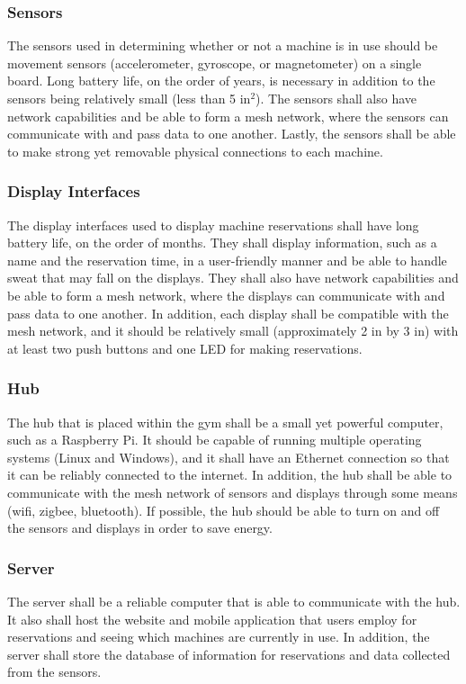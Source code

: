 \documentclass[PPFS.tex]{template/subfiles}
\begin{document}
\subsubsection{Sensors}
The sensors used in determining whether or not a machine is in use should be movement sensors (accelerometer, gyroscope, or magnetometer) on a single board. Long battery life, on the order of years, is necessary in addition to the sensors being relatively small (less than 5 in$^2$). The sensors shall also have network capabilities and be able to form a mesh network, where the sensors can communicate with and pass data to one another. Lastly, the sensors shall be able to make strong yet removable physical connections to each machine.

\subsubsection{Display Interfaces}
The display interfaces used to display machine reservations shall have long battery life, on the order of months. They shall display information, such as a name and the reservation time, in a user-friendly manner and be able to handle sweat that may fall on the displays. They shall also have network capabilities and be able to form a mesh network, where the displays can communicate with and pass data to one another. In addition, each display shall be compatible with the mesh network, and it should be relatively small (approximately 2 in by 3 in) with at least two push buttons and one LED for making reservations.

\subsubsection{Hub}
The hub that is placed within the gym shall be a small yet powerful computer, such as a Raspberry Pi. It should be capable of running multiple operating systems (Linux and Windows), and it shall have an Ethernet connection so that it can be reliably connected to the internet. In addition, the hub shall be able to communicate with the mesh network of sensors and displays through some means (wifi, zigbee, bluetooth). If possible, the hub should be able to turn on and off the sensors and displays in order to save energy.

\subsubsection{Server}
The server shall be a reliable computer that is able to communicate with the hub. It also shall host the website and mobile application that users employ for reservations and seeing which machines are currently in use. In addition, the server shall store the database of information for reservations and data collected from the sensors.
\end{document}
